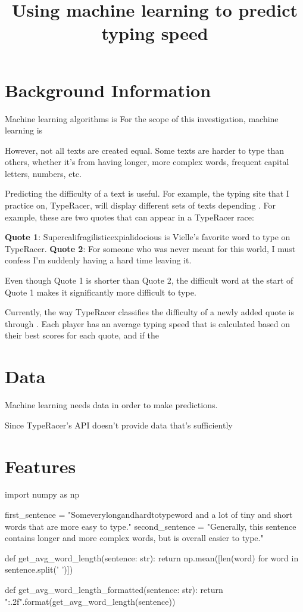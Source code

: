 \documentclass{article}
\title{Using machine learning to predict typing speed}
\begin{document}
\maketitle

\section{Background Information}

Machine learning algorithms is For the scope of this investigation, machine learning is

However, not all texts are created equal. Some texts are harder to type than others, whether it's from having longer, more complex words, frequent capital letters, numbers, etc.

Predicting the difficulty of a text is useful. For example, the typing site that I practice on, TypeRacer, will display different sets of texts depending . For example, these are two quotes that can appear in a TypeRacer race:

\textbf{Quote 1}: Supercalifragilisticexpialidocious is Vielle's favorite word to type on TypeRacer.
\textbf{Quote 2}: For someone who was never meant for this world, I must confess I'm suddenly having a hard time leaving it.

Even though Quote 1 is shorter than Quote 2, the difficult word at the start of Quote 1 makes it significantly more difficult to type.

Currently, the way TypeRacer classifies the difficulty of a newly added quote is through . Each player has an average typing speed that is calculated based on their best scores for each quote, and if the

\section{Data}


Machine learning needs data in order to make predictions.

Since TypeRacer's API doesn't provide data that's sufficiently

\section{Features}

\begin{pycode}
import numpy as np

first_sentence = "Someverylongandhardtotypeword and a lot of tiny and short words that are more easy to type."
second_sentence = "Generally, this sentence contains longer and more complex words, but is overall easier to type."

def get_avg_word_length(sentence: str):
	return np.mean([len(word) for word in sentence.split(' ')])

def get_avg_word_length_formatted(sentence: str):
	return "{:.2f}".format(get_avg_word_length(sentence))
\end{pycode}
\end{document}

